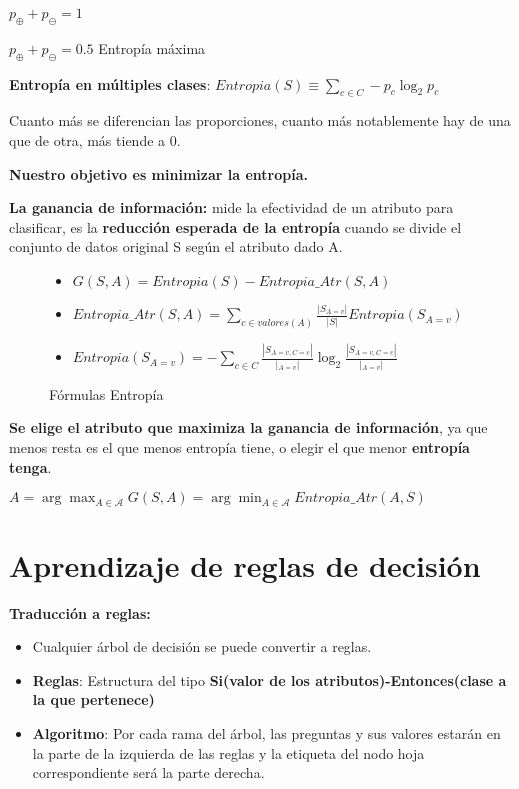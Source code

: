 \documentclass[12pt, twoside, openright]{report} %
\begin{document}
\(p_\oplus+p_\ominus=1\)

\(p_\oplus+p_\ominus=0.5\) Entropía máxima

\textbf{Entropía en múltiples clases}: \(Entropia(S) \equiv \sum_{c\in C} -p_c \log _2 p_c\)

Cuanto más se diferencian las proporciones, cuanto más notablemente hay de una que de otra, más tiende a 0.

\textbf{Nuestro objetivo es minimizar la entropía.}

\textbf{La ganancia de información:} mide la efectividad de un atributo para clasificar, es la \textbf{reducción esperada de la entropía} cuando se divide el conjunto de datos original S según el atributo dado A.
\begin{figure}[H]
	\begin{itemize}
		\item \(G(S, A)=Entropia(S) - Entropia\_ Atr(S, A)\)
		\item \(Entropia\_ Atr(S, A)= \sum_{c \in valores(A)} \frac {|S_{A=v}|}{|S|} Entropia(S_{A=v})\)
		\item \(Entropia(S_{A=v})= -\sum_{c \in C} \frac {|S_{A=v, C=c}|}{|_{A=v}|} \log_2 \frac {|S_{A=v,C=c}|}{|_{A=v}|}\)
	\end{itemize}
	\captionsetup{justification=centering}
	\caption{Fórmulas Entropía}
\end{figure}


\textbf{Se elige el atributo que maximiza la ganancia de información}, ya que menos resta es el que menos entropía tiene, o elegir el que menor \textbf{entropía tenga}.

\(A= \arg\max_{A \in \mathcal{A}} G(S,A) = \arg\min_{A \in \mathcal{A}} Entropia \_ Atr(A,S)\)

\section{Aprendizaje de reglas de decisión}

\textbf{Traducción a reglas:}

\begin{itemize}
	\item Cualquier árbol de decisión se puede convertir a reglas.
	\item \textbf{Reglas}: Estructura del tipo \textbf{Si(valor de los atributos)-Entonces(clase a la que pertenece)}
	\item \textbf{Algoritmo}: Por cada rama del árbol, las preguntas y sus valores estarán en la parte de la izquierda de las reglas y la etiqueta del nodo hoja correspondiente será la parte derecha.
\end{itemize}
\end{document}
